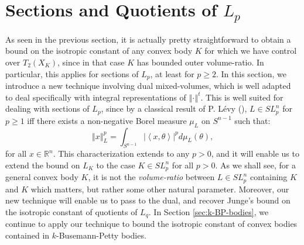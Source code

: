 \documentclass[12pt,oneside]{amsart}
\newtheorem{prop}[thm]{Proposition}
\theoremstyle{definition}
\theoremstyle{remark}
\theoremstyle{proof}
\numberwithin{equation}{section}
\newcommand{\norm}[1]{\left\Vert#1\right\Vert}
\newcommand{\abs}[1]{\left\vert#1\right\vert}
\newcommand{\brac}[1]{\left(#1\right)}
\newcommand{\scalar}[1]{\left \langle #1 \right \rangle}
\newcommand{\abscalar}[1]{\abs{\scalar{#1}}}
\newcommand{\Real}{\mathbb{R}}
\begin{document}




\section{Sections and Quotients of $L_p$} \label{sec:SectionsOfLp}

As seen in the previous section, it is actually pretty
straightforward to obtain a bound on the isotropic constant of
any convex body $K$ for which we have control over $T_2(X_K)$,
since in that case $K$ has bounded outer volume-ratio. In
particular, this applies for sections of $L_p$, at least for $p
\geq 2$. In this section, we introduce a new technique involving
dual mixed-volumes, which is well adapted to deal specifically
with integral representations of $\norm{\cdot}^t$. This is well
suited for dealing with sections of $L_p$, since by a classical
result of P. L\'{e}vy (\cite{Levy}), $L \in SL_p^n$ for $p\geq 1$
iff there exists a non-negative Borel measure $\mu_L$ on $S^{n-1}$
such that:
\begin{equation} \label{eq:L_p-representation}
\norm{x}_L^p = \int_{S^{n-1}} \abscalar{x,\theta} ^p
d\mu_L(\theta),
\end{equation}
for all $x \in \Real^n$. This characterization extends to any
$p>0$, and it will enable us to extend the bound on $L_K$ to the
case $K \in SL_p^n$ for all $p > 0$. As we shall see, for a
general convex body $K$, it is not the \emph{volume-ratio}
between $L \in SL_p^n$ containing $K$ and $K$ which matters, but
rather some other natural parameter. Moreover, our new technique
will enable us to pass to the dual, and recover Junge's bound on
the isotropic constant of quotients of $L_q$. In Section
\ref{sec:k-BP-bodies}, we continue to apply our technique to
bound the isotropic constant of convex bodies contained in
$k$-Busemann-Petty bodies.
\end{document}
